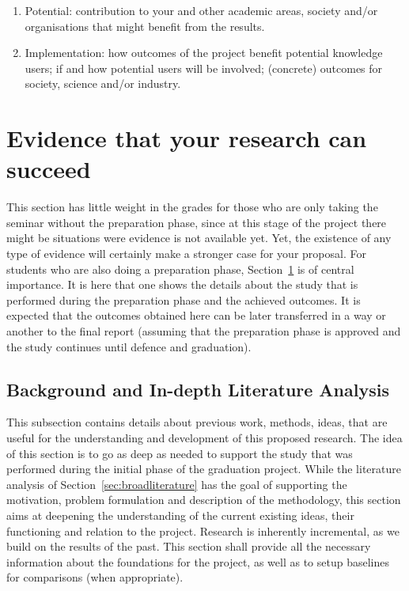\documentclass{article}
\begin{document}
\begin{enumerate}
\item Potential: contribution to your and other academic areas, society and/or organisations that might benefit from the results. 

\item Implementation: how outcomes of the project benefit potential knowledge users; if and how potential users will be involved; (concrete) outcomes for society, science and/or industry.
\end{enumerate}


\section{Evidence that your research can succeed}\label{sec:evidence}

This section has little weight in the grades for those who are only taking the seminar without the preparation phase, since at this stage of the project there might be situations were evidence is not available yet. Yet, the existence of any type of evidence will certainly make a stronger case for your proposal. For students who are also doing a preparation phase, Section~\ref{sec:evidence} is of central importance. It is here that one shows the details about the study that is performed during the preparation phase and the achieved outcomes. It is expected that the outcomes obtained here can be later transferred in a way or another to the final report (assuming that the preparation phase is approved and the study continues until defence and graduation).

\subsection{Background and In-depth Literature Analysis}\label{sec:background}

This subsection contains details about previous work, methods, ideas, that are useful for the understanding and development of this proposed research. The idea of this section is to go as deep as needed to support the study that was performed during the initial phase of the graduation project. While the literature analysis of Section~\ref{sec:broadliterature} has the goal of supporting the motivation, problem formulation and description of the methodology, this section aims at deepening the understanding of the current existing ideas, their functioning and relation to the project. Research is inherently incremental, as we build on the results of the past. This section shall provide all the necessary information about the foundations for the project, as well as to setup baselines for comparisons (when appropriate).
\end{document}
